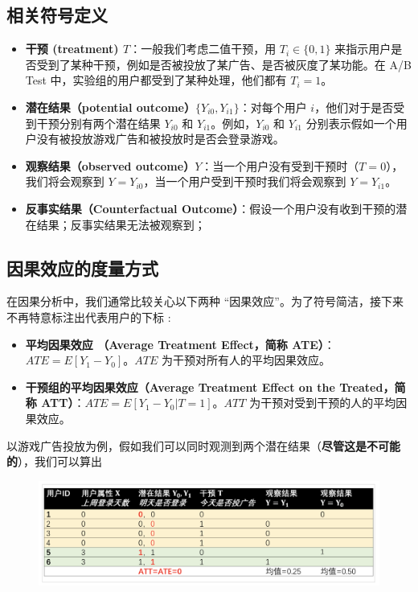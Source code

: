 \documentclass[12pt]{article}
\begin{document}
\subsection{相关符号定义}
\begin{itemize}
\setlength{\itemsep}{0pt}
\setlength{\parsep}{0pt}
\setlength{\parskip}{0pt}
    \item \textbf{干预 (treatment) $T$}：一般我们考虑二值干预，用 $T_i \in \{0,1\}$ 来指示用户是否受到了某种干预，例如是否被投放了某广告、是否被灰度了某功能。在 A/B Test 中，实验组的用户都受到了某种处理，他们都有 $T_i=1$。

    \item \textbf{潜在结果（potential outcome）$\{Y_{i0}, Y_{i1}\}$}：对每个用户 $i$，他们对于是否受到干预分别有两个潜在结果 $Y_{i0}$ 和 $Y_{i1}$。例如，$Y_{i0}$ 和 $Y_{i1}$ 分别表示假如一个用户没有被投放游戏广告和被投放时是否会登录游戏。
    
    \item \textbf{观察结果（observed outcome）$Y$}：当一个用户没有受到干预时（$T=0$），我们将会观察到 $Y=Y_{i0}$，当一个用户受到干预时我们将会观察到 $Y=Y_{i1}$。
    
    \item \textbf{反事实结果（Counterfactual Outcome）}：假设一个用户没有收到干预的潜在结果；反事实结果无法被观察到；
\end{itemize}


\subsection{因果效应的度量方式}
在因果分析中，我们通常比较关心以下两种 “因果效应”。为了符号简洁，接下来不再特意标注出代表用户的下标 :
\begin{itemize}
\setlength{\itemsep}{0pt}
\setlength{\parsep}{0pt}
\setlength{\parskip}{0pt}
    \item \textbf{平均因果效应 （Average Treatment Effect，简称 ATE）}： $ATE=E[Y_1 - Y_0]$。$ATE$ 为干预对所有人的平均因果效应。

    \item \textbf{干预组的平均因果效应（Average Treatment Effect on the Treated，简称 ATT）}：$ATE=E[Y_1 - Y_0|T = 1]$。$ATT$ 为干预对受到干预的人的平均因果效应。
\end{itemize}

以游戏广告投放为例，假如我们可以同时观测到两个潜在结果（\textbf{尽管这是不可能的}），我们可以算出 
\begin{figure}[H]
    \centering
    \includegraphics[width=1\textwidth]{fig/CasualInference-Game-Ad-1.png}
\end{figure}
\end{document}

